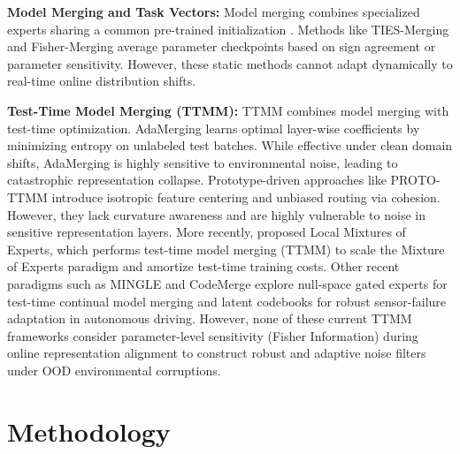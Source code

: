 \documentclass{article}
\theoremstyle{plain}
\theoremstyle{definition}
\theoremstyle{remark}
\begin{document}
\textbf{Model Merging and Task Vectors:} Model merging combines specialized experts sharing a common pre-trained initialization \citep{ilharco2022editing, matena2021merging, choi2024dare}. Methods like TIES-Merging \citep{yadav2023ties} and Fisher-Merging \citep{matena2021merging} average parameter checkpoints based on sign agreement or parameter sensitivity. However, these static methods cannot adapt dynamically to real-time online distribution shifts.

\textbf{Test-Time Model Merging (TTMM):} TTMM combines model merging with test-time optimization. AdaMerging \citep{yang2024adamerging} learns optimal layer-wise coefficients by minimizing entropy on unlabeled test batches. While effective under clean domain shifts, AdaMerging is highly sensitive to environmental noise, leading to catastrophic representation collapse. Prototype-driven approaches like PROTO-TTMM \citep{sub8_anon} introduce isotropic feature centering and unbiased routing via cohesion. However, they lack curvature awareness and are highly vulnerable to noise in sensitive representation layers. More recently, \citet{bertolissi2025local} proposed Local Mixtures of Experts, which performs test-time model merging (TTMM) to scale the Mixture of Experts paradigm and amortize test-time training costs. Other recent paradigms such as MINGLE \citep{yang2025mingle} and CodeMerge \citep{yang2025codemerge} explore null-space gated experts for test-time continual model merging and latent codebooks for robust sensor-failure adaptation in autonomous driving. However, none of these current TTMM frameworks consider parameter-level sensitivity (Fisher Information) during online representation alignment to construct robust and adaptive noise filters under OOD environmental corruptions.

\section{Methodology}
\label{submission-method}
\end{document}
